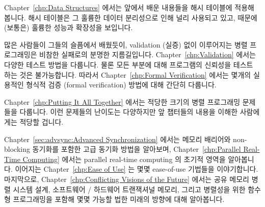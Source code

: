Chapter~\ref{chp:Data Structures} 에서는 앞에서 배운 내용들을 해시 테이블에
적용해 봅니다.
해시 테이블은 그 훌륭한 데이터 분리성으로 인해 널리 사용되고 있고, 때문에
(보통은) 훌륭한 성능과 확장성을 보입니다.
\iffalse

Chapter~\ref{chp:Data Structures} applies the lessons of previous
chapters to hash tables, which are heavily used due
to their excellent partitionability, which (usually) leads to excellent
performance and scalability.
\fi

많은 사람들이 그들의 슬픔에서 배웠듯이, validation (실증) 없이 이루어지는 병렬
프로그래밍은 비참한 실패로의 분명한 지름길입니다.
Chapter~\ref{chp:Validation} 에서는 다양한 테스트 방법을 다룹니다.
물론 모든 부분에 대해 프로그램의 신뢰성을 테스트 하는 것은 불가능합니다.
따라서 Chapter~\ref{chp:Formal Verification} 에서는 몇개의 실용적인 형식적
검증 (formal verification) 방법에 대해 간단히 다룹니다.
\iffalse

As many have learned to their sorrow, parallel programming without
validation is a sure path to abject failure.
Chapter~\ref{chp:Validation} covers various forms of testing.
It is of course impossible to test reliability into your program
after the fact, so Chapter~\ref{chp:Formal Verification}
follows up with a brief overview of a couple of practical approaches to
formal verification.
\fi

Chapter~\ref{chp:Putting It All Together} 에서는 적당한 크기의 병렬 프로그래밍
문제들을 다룹니다.
이런 문제들의 난이도는 다양하지만 앞 챕터들의 내용을 이해한 사람에게는 적당할
겁니다.
\iffalse

Chapter~\ref{chp:Putting It All Together}
contains a series of moderate-sized parallel programming problems.
The difficulty of these problems vary, but should be appropriate for
someone who has mastered the material in the previous chapters.
\fi

Chapter~\ref{sec:advsync:Advanced Synchronization} 에서는 메모리 배리어와
non-blocking 동기화를 포함한 고급 동기화 방법을 알아보며,
Chapter~\ref{chp:Parallel Real-Time Computing} 에서는 parallel real-time
computing 의 초기적 영역을 알아봅니다.
이어지는 Chapter~\ref{chp:Ease of Use} 는 몇몇 ease-of-use 기법들을
이야기합니다.
마지막으로, Chapter~\ref{chp:Conflicting Visions of the Future} 에서는 공유
메모리 병렬 시스템 설계, 소프트웨어 / 하드웨어 트랜잭셔널 메모리, 그리고
병렬성을 위한 함수형 프로그래밍을 포함해 몇몇 가능할 법한 미래의 방향에 대해
알아봅니다.
\iffalse

Chapter~\ref{sec:advsync:Advanced Synchronization}
looks at advanced synchronization methods, including memory barriers
and non-blocking synchronization, while
Chapter~\ref{chp:Parallel Real-Time Computing}
looks at the nascent field of parallel real-time computing.
Chapter~\ref{chp:Ease of Use} follows up with some ease-of-use advice.
Finally, Chapter~\ref{chp:Conflicting Visions of the Future}
looks at a few possible future directions, including
shared-memory parallel system design, software and hardware transactional
memory, and functional programming for parallelism.
\fi

